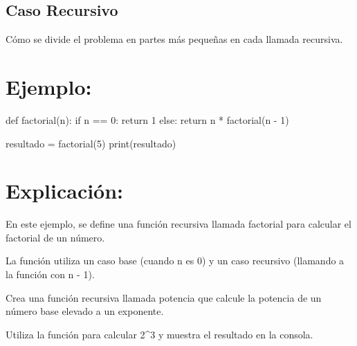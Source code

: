 \documentclass[
  a4paper,
  DIV=11,
  numbers=noendperiod,
  onepage,
  openany]{scrreprt}
\newenvironment{Shaded}{\begin{snugshade}}{\end{snugshade}}
\newcommand{\BuiltInTok}[1]{\textcolor[rgb]{0.00,0.23,0.31}{#1}}
\newcommand{\ControlFlowTok}[1]{\textcolor[rgb]{0.00,0.23,0.31}{#1}}
\newcommand{\DecValTok}[1]{\textcolor[rgb]{0.68,0.00,0.00}{#1}}
\newcommand{\KeywordTok}[1]{\textcolor[rgb]{0.00,0.23,0.31}{#1}}
\newcommand{\NormalTok}[1]{\textcolor[rgb]{0.00,0.23,0.31}{#1}}
\newcommand{\OperatorTok}[1]{\textcolor[rgb]{0.37,0.37,0.37}{#1}}
\begin{document}
\hypertarget{caso-recursivo-1}{%
\subsection{Caso Recursivo}\label{caso-recursivo-1}}

Cómo se divide el problema en partes más pequeñas en cada llamada
recursiva.

\hypertarget{ejemplo-47}{%
\section{Ejemplo:}\label{ejemplo-47}}

\begin{Shaded}
\begin{Highlighting}[]
\KeywordTok{def}\NormalTok{ factorial(n):}
    \ControlFlowTok{if}\NormalTok{ n }\OperatorTok{==} \DecValTok{0}\NormalTok{:}
        \ControlFlowTok{return} \DecValTok{1}
    \ControlFlowTok{else}\NormalTok{:}
        \ControlFlowTok{return}\NormalTok{ n }\OperatorTok{*}\NormalTok{ factorial(n }\OperatorTok{{-}} \DecValTok{1}\NormalTok{)}

\NormalTok{resultado }\OperatorTok{=}\NormalTok{ factorial(}\DecValTok{5}\NormalTok{)}
\BuiltInTok{print}\NormalTok{(resultado)}
\end{Highlighting}
\end{Shaded}

\hypertarget{explicaciuxf3n-47}{%
\section{Explicación:}\label{explicaciuxf3n-47}}

En este ejemplo, se define una función recursiva llamada factorial para
calcular el factorial de un número.

La función utiliza un caso base (cuando n es 0) y un caso recursivo
(llamando a la función con n - 1).

\begin{tcolorbox}[enhanced jigsaw, colbacktitle=quarto-callout-important-color!10!white, toprule=.15mm, leftrule=.75mm, titlerule=0mm, opacityback=0, rightrule=.15mm, opacitybacktitle=0.6, breakable, left=2mm, coltitle=black, title=\textcolor{quarto-callout-important-color}{\faExclamation}\hspace{0.5em}{Actividad Práctica:}, toptitle=1mm, bottomtitle=1mm, arc=.35mm, bottomrule=.15mm, colback=white, colframe=quarto-callout-important-color-frame]

Crea una función recursiva llamada potencia que calcule la potencia de
un número base elevado a un exponente.

Utiliza la función para calcular 2\^{}3 y muestra el resultado en la
consola.

\end{tcolorbox}
\end{document}
